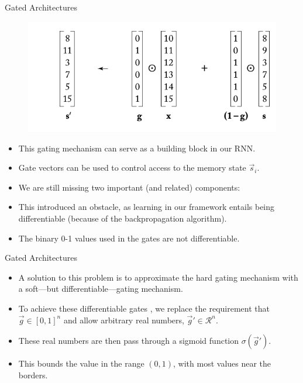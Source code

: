 \documentclass[handout]{beamer}
\begin{document}
\begin{frame}{Gated Architectures}
\begin{scriptsize}
  \begin{figure}[h]
        	\includegraphics[scale = 0.35]{pics/gatedEx.png}
        \end{figure}
\begin{itemize}
\item This gating mechanism can serve as a building block in our RNN.
\item Gate vectors can be used to control access to the memory state $\vec{s}_i$.
\item We are still missing two important (and related) components: 
\begin{enumerate}
\end{enumerate}
\item This introduced an obstacle, as learning in our framework entails being differentiable (because of the backpropagation algorithm).
\item The binary 0-1 values used in the gates are not differentiable.
\end{itemize}
\end{scriptsize}
\end{frame}


\begin{frame}{Gated Architectures}
\begin{scriptsize}

\begin{itemize}
\item A solution to this problem is to approximate the hard gating mechanism with a soft—but differentiable—gating mechanism.
\item To achieve these differentiable gates , we replace the requirement that $\vec{g} \in [0,1]^n$ and allow arbitrary real numbers, $\vec{g}' \in \mathcal{R}^n$.
\item These real numbers are then pass through a sigmoid function $\sigma(\vec{g}')$.
\item This bounds the value in the range $(0,1)$, with most values
near the borders.
\end{itemize}
\end{scriptsize}
\end{frame}
\end{document}
